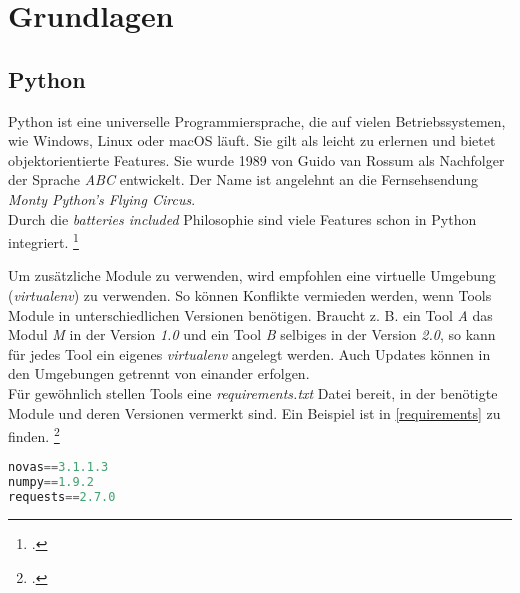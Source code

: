 % 
% 
% 


\chapter{Grundlagen} \label{theg}



\newpage
\section{Python}
Python ist eine universelle Programmiersprache, die auf vielen Betriebssystemen, wie Windows, Linux oder macOS läuft. Sie gilt als leicht zu erlernen und bietet objektorientierte Features. Sie wurde 1989 von Guido van Rossum als Nachfolger der Sprache \textit{ABC} entwickelt. Der Name ist angelehnt an die Fernsehsendung \textit{Monty Python's Flying Circus}.\\
Durch die \textit{batteries included} Philosophie sind viele Features schon in Python integriert.
\footcite[Vgl.][1\psqq]{Gowrishankar_2019_Python}

Um zusätzliche Module zu verwenden, wird empfohlen eine virtuelle Umgebung (\textit{virtualenv}) zu verwenden. So können Konflikte vermieden werden, wenn Tools Module in unterschiedlichen Versionen benötigen. Braucht z. B. ein Tool \textit{A} das Modul \textit{M} in der Version \textit{1.0} und ein Tool \textit{B} selbiges in der Version \textit{2.0}, so kann für jedes Tool ein eigenes \textit{virtualenv} angelegt werden. Auch Updates können in den Umgebungen getrennt von einander erfolgen.\\
Für gewöhnlich stellen Tools eine \textit{requirements.txt} Datei bereit, in der benötigte Module und deren Versionen vermerkt sind. Ein Beispiel ist in \autoref{requirements} zu finden.
\footcite[Vgl.][o. \pno]{Python_venv}

\begin{lstlisting}[language=python, label=requirements, caption=Beispiel requirements.txt]
novas==3.1.1.3
numpy==1.9.2
requests==2.7.0
\end{lstlisting}


